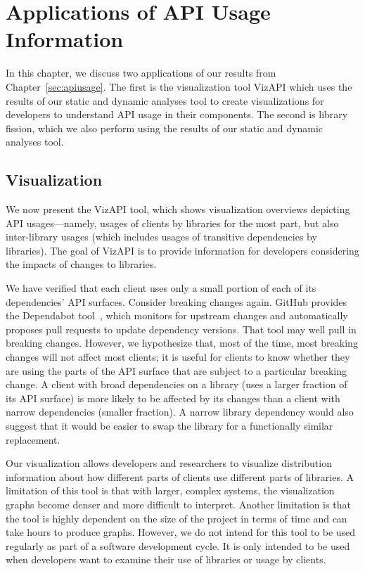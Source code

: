 \chapter{Applications of API Usage Information}
\label{sec:applications}
In this chapter, we discuss two applications of our results from Chapter~\ref{sec:apiusage}. The first is the visualization tool VizAPI which uses the results of our static and dynamic analyses tool to create visualizations for developers to understand API usage in their components. The second is library fission, which we also perform using the results of our static and dynamic analyses tool.


\section{Visualization}
\label{sec:visualization}
We now present the VizAPI tool, which shows visualization overviews depicting API usages---namely, usages of clients by libraries for the most part, but also inter-library usages (which includes usages of transitive dependencies by libraries). The goal of VizAPI is to provide information for developers considering the impacts of changes to libraries.

We have verified that each client uses only a small portion of each of its dependencies' API surfaces. Consider breaking changes again. GitHub provides the Dependabot tool~\cite{mullans20:_keep_depen}, which monitors for upstream changes and automatically proposes pull requests to update dependency versions. That tool may well pull in breaking changes. However, we hypothesize that, most of the time, most breaking changes will not affect most clients; it is useful for clients to know whether they are using the parts of the API surface that are subject to a particular breaking change. A client with broad dependencies on a library (uses a larger fraction of its API surface) is more likely to be affected by its changes than a client with narrow dependencies (smaller fraction). A narrow library dependency would also suggest that it would be easier to swap the library for a functionally similar replacement.

Our visualization allows developers and
researchers to visualize distribution information about how different
parts of clients use different parts of libraries. 
A limitation of this tool is that with larger, complex systems, the visualization graphs become denser and more difficult to interpret.
Another limitation is that the tool is highly dependent on the size of the project in terms of time and can take hours to produce graphs.
However, we do not intend for this tool to be used regularly as part of a software development cycle. 
It is only intended to be used when developers want to examine their use of libraries or usage by clients.

